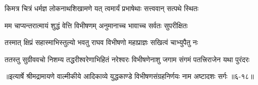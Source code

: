 \twolineshloka
{किमत्र चित्रं धर्मज्ञ लोकनाथशिखामणे}
{यत् त्वमार्यं प्रभाषेथाः सत्त्ववान् सत्पथे स्थितः} %

\twolineshloka
{मम चाप्यन्तरात्मायं शुद्धं वेत्ति विभीषणम्}
{अनुमानाच्च भावाच्च सर्वतः सुपरीक्षितः} %

\twolineshloka
{तस्मात् क्षिप्रं सहास्माभिस्तुल्यो भवतु राघव}
{विभीषणो महाप्राज्ञः सखित्वं चाभ्युपैतु नः} %

\twolineshloka
{ततस्तु सुग्रीववचो निशम्य तद्धरीश्वरेणाभिहितं नरेश्वरः}
{विभीषणेनाशु जगाम संगमं पतत्त्रिराजेन यथा पुरंदरः} %


॥इत्यार्षे श्रीमद्रामायणे वाल्मीकीये आदिकाव्ये युद्धकाण्डे विभीषणसंग्रहनिर्णयः नाम अष्टादशः सर्गः ॥६-१८॥
